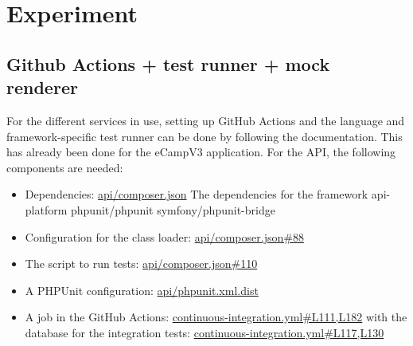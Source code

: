 \documentclass[conference]{IEEEtran}
\begin{document}
\section{Experiment}
\subsection{Github Actions + test runner + mock renderer}
For the different services in use, setting up GitHub Actions and the language and framework-specific test runner can be done by following the documentation.
This has already been done for the eCampV3 application.\newline
For the API, the following components are needed:
\begin{itemize}
	\item Dependencies: \href{https://github.com/ecamp/ecamp3/blob/7a1cf92e3eee27b0b942fcd87bd8ce5c221089b7/api/composer.json}{api/composer.json}
	      \subitem The dependencies for the framework api-platform
	      \subitem phpunit/phpunit
	      \subitem symfony/phpunit-bridge
	\item Configuration for the class loader: \href{https://github.com/ecamp/ecamp3/blob/7a1cf92e3eee27b0b942fcd87bd8ce5c221089b7/api/composer.json\#L88}{api/composer.json\#88}
	\item The script to run tests: \href{https://github.com/ecamp/ecamp3/blob/7a1cf92e3eee27b0b942fcd87bd8ce5c221089b7/api/composer.json\#L110}{api/composer.json\#110}
	\item A PHPUnit configuration: \href{https://github.com/ecamp/ecamp3/blob/7a1cf92e3eee27b0b942fcd87bd8ce5c221089b7/api/phpunit.xml.dist}{api/phpunit.xml.dist}
	\item A job in the GitHub Actions: \href{https://github.com/ecamp/ecamp3/blob/7a1cf92e3eee27b0b942fcd87bd8ce5c221089b7/.github/workflows/continuous-integration.yml#L111,L182}{continuous-integration.yml\#L111,L182}
	      \subitem with the database for the integration tests: \href{https://github.com/ecamp/ecamp3/blob/7a1cf92e3eee27b0b942fcd87bd8ce5c221089b7/.github/workflows/continuous-integration.yml#L117,L130}{continuous-integration.yml\#L117,L130}
\end{itemize}
\end{document}
